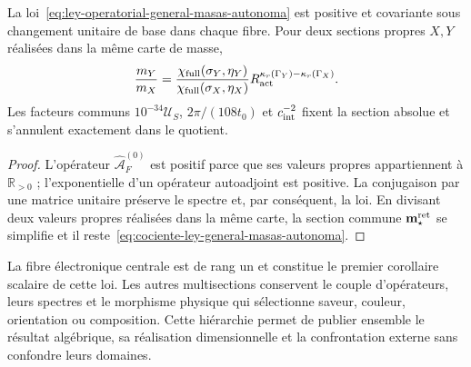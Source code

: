 \begin{theorem}
\label{thm:covariancia-ley-general-masas-autonoma}
La loi~\eqref{eq:ley-operatorial-general-masas-autonoma} est positive et
covariante sous changement unitaire de base dans chaque fibre. Pour deux sections propres
\(X,Y\) réalisées dans la même carte de masse,
\begin{equation}
 \frac{m_Y}{m_X}
 =\frac{\chi_{\rm full}(\sigma_Y,\eta_Y)}
        {\chi_{\rm full}(\sigma_X,\eta_X)}
  R_{\rm act}^{\kappa_r(\Gamma_Y)-\kappa_r(\Gamma_X)}.
 \label{eq:cociente-ley-general-masas-autonoma}
\end{equation}
Les facteurs communs \(10^{-34}\mathcal U_S\), \(2\pi/(108t_0)\) et
\(c_{\rm int}^{-2}\) fixent la section absolue et s'annulent exactement dans
le quotient.
\end{theorem}

\begin{proof}
L'opérateur \(\widehat{\mathcal A}^{(0)}_F\) est positif parce que ses
valeurs propres appartiennent à \(\mathbb R_{>0}\) ; l'exponentielle d'un opérateur
autoadjoint est positive. La conjugaison par une matrice unitaire préserve le
spectre et, par conséquent, la loi. En divisant deux valeurs propres réalisées dans la
même carte, la section commune \(\mathbf m_\star^{\rm ret}\) se simplifie et
il reste~\eqref{eq:cociente-ley-general-masas-autonoma}.
\end{proof}

La fibre électronique centrale est de rang un et constitue le premier
corollaire scalaire de cette loi. Les autres multisections conservent le couple
d'opérateurs, leurs spectres et le morphisme physique qui sélectionne saveur,
couleur, orientation ou composition. Cette hiérarchie permet de publier ensemble le
résultat algébrique, sa réalisation dimensionnelle et la confrontation externe sans
confondre leurs domaines.
